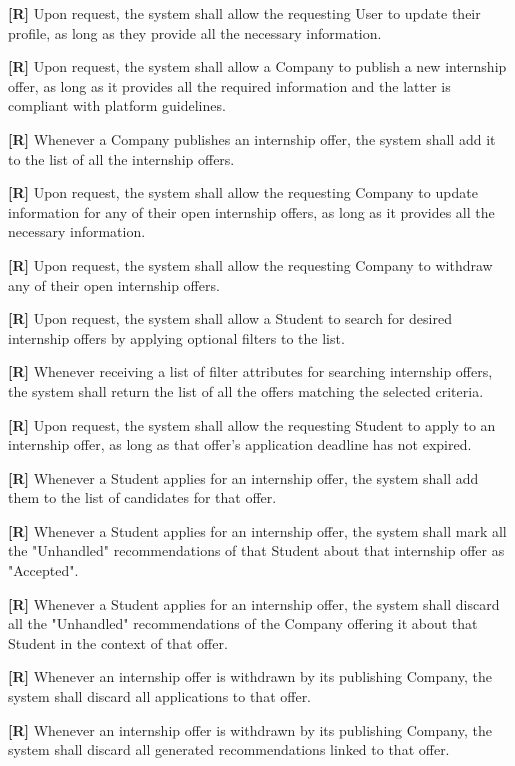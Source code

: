         \textbf{[R\creq]} Upon request, the system shall allow the requesting User to update their profile, as long as they provide all the necessary information.

        \textbf{[R\creq]} Upon request, the system shall allow a Company to publish a new internship offer, as long as it provides all the required information and the latter is compliant with platform guidelines.

        \textbf{[R\creq]} Whenever a Company publishes an internship offer, the system shall add it to the list of all the internship offers.

        \textbf{[R\creq]} Upon request, the system shall allow the requesting Company to update information for any of their open internship offers, as long as it provides all the necessary information.

        \textbf{[R\creq]} Upon request, the system shall allow the requesting Company to withdraw any of their open internship offers.
        
        \textbf{[R\creq]} Upon request, the system shall allow a Student to search for desired internship offers by applying optional filters to the list.

        \textbf{[R\creq]} Whenever receiving a list of filter attributes for searching internship offers, the system shall return the list of all the offers matching the selected criteria.

        \textbf{[R\creq]} Upon request, the system shall allow the requesting Student to apply to an internship offer, as long as that offer's application deadline has not expired.

        \textbf{[R\creq]} Whenever a Student applies for an internship offer, the system shall add them to the list of candidates for that offer.

        \textbf{[R\creq]} Whenever a Student applies for an internship offer, the system shall mark all the "Unhandled" recommendations of that Student about that internship offer as "Accepted".

        \textbf{[R\creq]} Whenever a Student applies for an internship offer, the system shall discard all the "Unhandled" recommendations of the Company offering it about that Student in the context of that offer.

        \textbf{[R\creq]} Whenever an internship offer is withdrawn by its publishing Company, the system shall discard all applications to that offer.

        \textbf{[R\creq]} Whenever an internship offer is withdrawn by its publishing Company, the system shall discard all generated recommendations linked to that offer.

